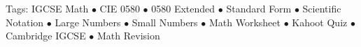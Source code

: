 \documentclass[11pt,a4paper]{article}
\begin{document}
\vspace{14pt}
\begin{center}
  \sffamily\scriptsize\textcolor{textmuted}{
    Tags: IGCSE Math $\bullet$ CIE 0580 $\bullet$ 0580 Extended $\bullet$ Standard Form $\bullet$ Scientific Notation $\bullet$ Large Numbers $\bullet$ Small Numbers $\bullet$ Math Worksheet $\bullet$ Kahoot Quiz $\bullet$ Cambridge IGCSE $\bullet$ Math Revision
  }
\end{center}
\end{document}
